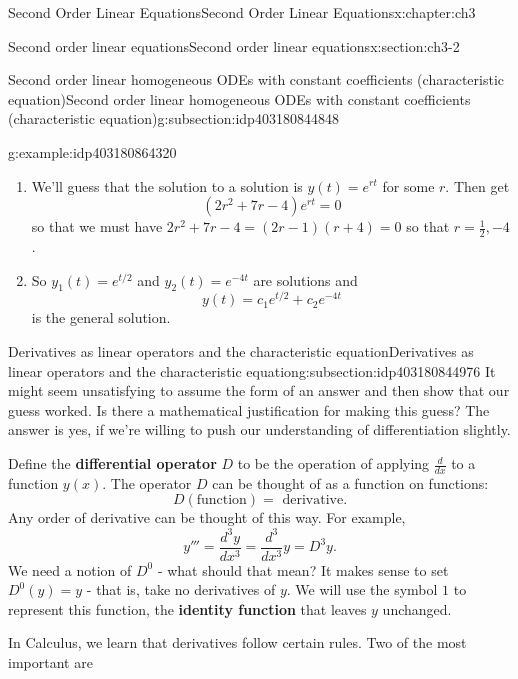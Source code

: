 \documentclass[oneside,10pt,]{book}
\newcommand{\terminology}[1]{\textbf{#1}}
\numberwithin{equation}{section}
\numberwithin{equation}{section}
\begin{document}
\begin{chapterptx}{Second Order Linear Equations}{}{Second Order Linear Equations}{}{}{x:chapter:ch3}
\begin{sectionptx}{Second order linear equations}{}{Second order linear equations}{}{}{x:section:ch3-2}
\begin{subsectionptx}{Second order linear homogeneous ODEs with constant coefficients (characteristic equation)}{}{Second order linear homogeneous ODEs with constant coefficients (characteristic equation)}{}{}{g:subsection:idp403180844848}
\begin{example}{}{g:example:idp403180864320}
\begin{equation*}
\end{equation*}
%
%
\begin{enumerate}
\item{}We'll guess that the solution to a solution is \(y(t)=e^{rt}\) for some \(r\). Then get%
\begin{equation*}
\left(2r^{2}+7r-4\right)e^{rt}=0
\end{equation*}
so that we must have \(2r^{2}+7r-4=\left(2r-1\right)\left(r+4\right)=0\) so that \(r=\frac{1}{2},-4\).%
\item{}So \(y_{1}(t)=e^{t/2}\) and \(y_{2}(t)=e^{-4t}\) are solutions and%
\begin{equation*}
y(t)=c_{1}e^{t/2}+c_{2}e^{-4t}
\end{equation*}
is the general solution.%
\end{enumerate}
\end{example}
\end{subsectionptx}
%
%
\typeout{************************************************}
\typeout{************************************************}
%
\begin{subsectionptx}{Derivatives as linear operators and the characteristic equation}{}{Derivatives as linear operators and the characteristic equation}{}{}{g:subsection:idp403180844976}
It might seem unsatisfying to assume the form of an answer and then show that our guess worked. Is there a mathematical justification for making this guess? The answer is yes, if we're willing to push our understanding of differentiation slightly.%
\par
Define the \terminology{differential operator} \(D\) to be the operation of applying \(\frac{d}{dx}\) to a function \(y(x)\). The operator \(D\) can be thought of as a function on functions:%
\begin{equation*}
D(\text{function}) = \text{ derivative}.
\end{equation*}
Any order of derivative can be thought of this way. For example,%
\begin{equation*}
y''' = \frac{d^3 y}{dx^3} = \frac{d^3}{dx^3} y = D^3 y.
\end{equation*}
We need a notion of \(D^0\) - what should that mean? It makes sense to set \(D^0(y) = y\) - that is, take no derivatives of \(y\). We will use the symbol \(1\) to represent this function, the \terminology{identity function} that leaves \(y\) unchanged.%
\par
In Calculus, we learn that derivatives follow certain rules. Two of the most important are%

\end{subsectionptx}
\end{sectionptx}
\end{chapterptx}
\end{document}
